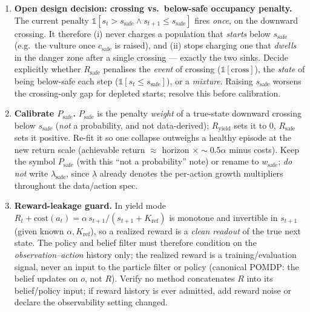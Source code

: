\documentclass[11pt]{article}
\newcommand{\Kref}{K_{\mathrm{ref}}}
\newcommand{\ssafe}{s_{\mathrm{safe}}}
\begin{document}
\begin{enumerate}[leftmargin=1.8em,nosep]
\item \textbf{Open design decision: crossing vs.\ below-safe occupancy penalty.} The
current penalty $\mathbb{1}[s_t>\ssafe\wedge s_{t+1}\le\ssafe]$ fires \emph{once}, on
the downward crossing. It therefore (i) never charges a population that \emph{starts}
below $\ssafe$ (e.g.\ the vulture once $c_{\mathrm{safe}}$ is raised), and (ii) stops
charging one that \emph{dwells} in the danger zone after a single crossing --- exactly
the two sinks. Decide explicitly whether $R_{\mathrm{safe}}$ penalises the \emph{event}
of crossing ($\mathbb{1}[\text{cross}]$), the \emph{state} of being below-safe each
step ($\mathbb{1}[s_t\le\ssafe]$), or a \emph{mixture}. Raising $\ssafe$ worsens the
crossing-only gap for depleted starts; resolve this before calibration.
\item \textbf{Calibrate $P_{\mathrm{safe}}$.} $P_{\mathrm{safe}}$ is the penalty
\emph{weight} of a true-state downward crossing below $\ssafe$ (\emph{not} a
probability, and not data-derived); $R_{\mathrm{yield}}$ sets it to $0$,
$R_{\mathrm{safe}}$ sets it positive. Re-fit it so one collapse outweighs a healthy
episode at the new return scale (achievable return $\approx$ horizon
$\times\!\sim\!0.5\alpha$ minus costs). Keep the symbol $P_{\mathrm{safe}}$ (with this
``not a probability'' note) or rename to $w_{\mathrm{safe}}$; \emph{do not} write
$\lambda_{\mathrm{safe}}$, since $\lambda$ already denotes the per-action growth
multipliers throughout the data/action spec.
\item \textbf{Reward-leakage guard.} In yield mode
$R_t+\mathrm{cost}(a_t)=\alpha\,s_{t+1}/(s_{t+1}+\Kref)$ is monotone and invertible in
$s_{t+1}$ (given known $\alpha,\Kref$), so a realized reward is a \emph{clean readout}
of the true next state. The policy and belief filter must therefore condition on the
\emph{observation--action} history only; the realized reward is a
training/evaluation signal, never an input to the particle filter or policy (canonical
POMDP: the belief updates on $o$, not $R$). Verify no method concatenates $R$ into its
belief/policy input; if reward history is ever admitted, add reward noise or declare
the observability setting changed.
\end{enumerate}
\end{document}

